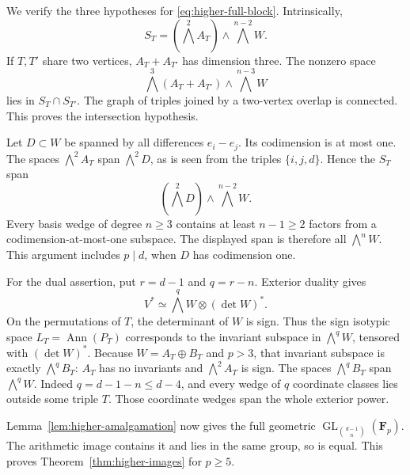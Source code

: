 We verify the three hypotheses for \eqref{eq:higher-full-block}. Intrinsically,
\[
S_T=(\bigwedge^2 A_T)\wedge\bigwedge^{n-2}W.
\]
If $T,T'$ share two vertices, $A_T+A_{T'}$ has dimension three. The nonzero space
\[
\bigwedge^3(A_T+A_{T'})\wedge\bigwedge^{n-3}W
\]
lies in $S_T\cap S_{T'}$. The graph of triples joined by a two-vertex overlap is connected. This proves the intersection hypothesis.

Let $D\subset W$ be spanned by all differences $e_i-e_j$. Its codimension is at most one. The spaces $\bigwedge^2 A_T$ span $\bigwedge^2D$, as is seen from the triples $\{i,j,d\}$. Hence the $S_T$ span
\[
(\bigwedge^2D)\wedge\bigwedge^{n-2}W.
\]
Every basis wedge of degree $n\ge3$ contains at least $n-1\ge2$ factors from a codimension-at-most-one subspace. The displayed span is therefore all $\bigwedge^nW$. This argument includes $p\mid d$, when $D$ has codimension one.

For the dual assertion, put $r=d-1$ and $q=r-n$. Exterior duality gives
\[
V^*\simeq\bigwedge^qW\otimes(\det W)^*.
\]
On the permutations of $T$, the determinant of $W$ is sign. Thus the sign isotypic space $L_T=\operatorname{Ann}(P_T)$ corresponds to the invariant subspace in $\bigwedge^qW$, tensored with $(\det W)^*$. Because $W=A_T\oplus B_T$ and $p>3$, that invariant subspace is exactly $\bigwedge^qB_T$: $A_T$ has no invariants and $\bigwedge^2A_T$ is sign. The spaces $\bigwedge^qB_T$ span $\bigwedge^qW$. Indeed $q=d-1-n\le d-4$, and every wedge of $q$ coordinate classes lies outside some triple $T$. Those coordinate wedges span the whole exterior power.

Lemma~\ref{lem:higher-amalgamation} now gives the full geometric $\operatorname{GL}_{\binom{d-1}n}(\mathbf F_p)$. The arithmetic image contains it and lies in the same group, so is equal. This proves Theorem~\ref{thm:higher-images} for $p\ge5$.
